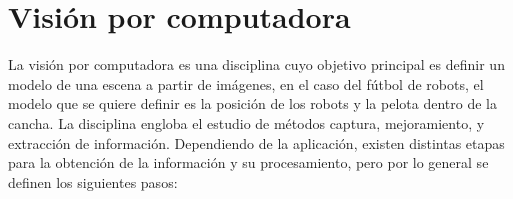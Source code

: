 
\section{Visión por computadora}

La visión por computadora es una disciplina cuyo objetivo principal es definir
un modelo de una escena a partir de imágenes\cite{cvLinda2001}, en el caso del
fútbol de robots, el modelo que se quiere definir es la posición de los robots y
la pelota dentro de la cancha. La disciplina engloba el estudio de métodos
captura, mejoramiento, y extracción de información. Dependiendo de la
aplicación, existen distintas etapas para la obtención de la información y su
procesamiento, pero por lo general se definen los siguientes
pasos\cite{digitalImageProcessing2ed,wikiCV}:

